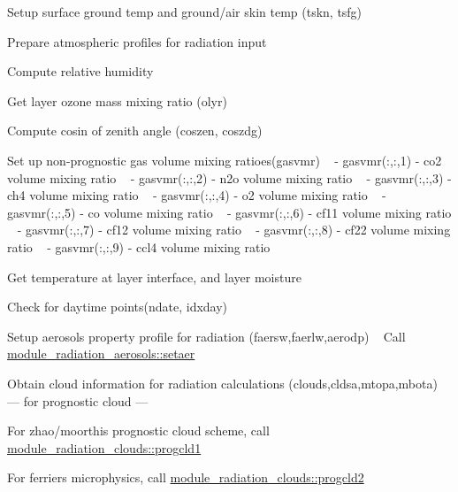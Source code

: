 \begin{DoxyEnumerate}
\item Setup surface ground temp and ground/air skin temp (tskn, tsfg)
\item Prepare atmospheric profiles for radiation input
\item Compute relative humidity
\item Get layer ozone mass mixing ratio (olyr)
\item Compute cosin of zenith angle (coszen, coszdg)
\item Set up non-\/prognostic gas volume mixing ratioes(gasvmr) ~\newline
 -\/ gasvmr(\+:,\+:,1) -\/ co2 volume mixing ratio ~\newline
 -\/ gasvmr(\+:,\+:,2) -\/ n2o volume mixing ratio ~\newline
 -\/ gasvmr(\+:,\+:,3) -\/ ch4 volume mixing ratio ~\newline
 -\/ gasvmr(\+:,\+:,4) -\/ o2 volume mixing ratio ~\newline
 -\/ gasvmr(\+:,\+:,5) -\/ co volume mixing ratio ~\newline
 -\/ gasvmr(\+:,\+:,6) -\/ cf11 volume mixing ratio ~\newline
 -\/ gasvmr(\+:,\+:,7) -\/ cf12 volume mixing ratio ~\newline
 -\/ gasvmr(\+:,\+:,8) -\/ cf22 volume mixing ratio ~\newline
 -\/ gasvmr(\+:,\+:,9) -\/ ccl4 volume mixing ratio
\item Get temperature at layer interface, and layer moisture
\item Check for daytime points(ndate, idxday)
\item Setup aerosols property profile for radiation (faersw,faerlw,aerodp) ~\newline
 Call \hyperlink{group__module__radiation__aerosols_ga559549bedb091683f71a705a875222d8}{module\+\_\+radiation\+\_\+aerosols\+::setaer}
\item Obtain cloud information for radiation calculations (clouds,cldsa,mtopa,mbota) ~\newline
 --- for prognostic cloud ---
\begin{DoxyItemize}
\item For zhao/moorthi\textquotesingle{}s prognostic cloud scheme, call \hyperlink{group__module__radiation__clouds_gae0f48ab3ed8fcd777d7abaa4f26f2eaf}{module\+\_\+radiation\+\_\+clouds\+::progcld1}
\item For ferrier\textquotesingle{}s microphysics, call \hyperlink{group__module__radiation__clouds_ga1651dc559f22ee01b28dd49fd25112d6}{module\+\_\+radiation\+\_\+clouds\+::progcld2}

\end{DoxyItemize}
\end{DoxyEnumerate}
